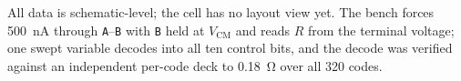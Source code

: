 All data is schematic-level; the cell has no layout view yet. The bench forces
\SI{500}{\nano\ampere} through \texttt{A}--\texttt{B} with \texttt{B} held at
\(V_{\mathrm{CM}}\) and reads \(R\) from the terminal voltage; one swept variable
decodes into all ten control bits, and the decode was verified against an
independent per-code deck to \SI{0.18}{\ohm} over all 320 codes.
